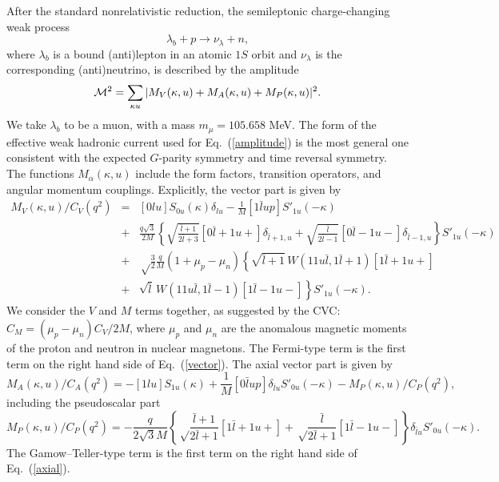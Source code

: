 After the standard nonrelativistic reduction, the semileptonic charge-changing 
weak process 
\begin{equation}\label{reaction}
  \lambda_b+p\to \nu_\lambda+n,
\end{equation}
where $\lambda_b$ is a bound (anti)lepton in an atomic $1S$ orbit and
$\nu_\lambda$ is the corresponding (anti)neutrino, is described by the
amplitude
\begin{equation}\label{amplitude}
  {\cal M}^2 = \sum_{\kappa u}| M_V(\kappa,u) + M_A(\kappa,u) 
  + M_P(\kappa,u) |^2.  
\end{equation} 
We take $\lambda_b$ to be a muon, with a mass $m_\mu = 105.658$ MeV. 
The form of the effective
weak hadronic current used for Eq.\ (\ref{amplitude}) is the most
general one consistent with the expected $G$-parity symmetry and time
reversal symmetry. The functions $M_\alpha(\kappa,u)$ include the form
factors,
transition operators, and angular momentum couplings. Explicitly, the
vector part is given by 
\begin{eqnarray}\label{vector}
  M_V(\kappa,u)/C_V(q^2)&=&[0lu]S_{0u}(\kappa)\delta_{lu}-\frac{1}{M}
  [1\bar lup]S'_{1u}(-\kappa)\nonumber\\
  &+&\frac{q\sqrt3}{2M}\left\lbrace \sqrt{\frac{\bar l+1}{2\bar l+3}}[0\bar l+1 u+]
    \delta_{\bar l+1,u}+\sqrt{\frac{\bar l}{2\bar l-1}}[0\bar l-1u-]\delta_{\bar l-1,u}
  \right\rbrace S'_{1u}(-\kappa)\nonumber\\
  &+&\sqrt\frac{3}{2}\frac{q}{M}(1+\mu_p-\mu_n)\left\lbrace \sqrt{\bar l+1}\,
    W(11u\bar l,1\bar l+1)[1\bar l+1u+]\right.\\
  &+&\left. \sqrt{\bar l}\,W(11u\bar l,1\bar l-1)[1\bar l-1u-]
  \right\rbrace S'_{1u}(-\kappa). \nonumber
\end{eqnarray}
We consider the $V$ and $M$ terms together, as
suggested by the CVC: $C_M = (\mu_p-\mu_n)C_V/2M$, where $\mu_p$ and $\mu_n$ are
the anomalous magnetic moments of the proton and neutron in nuclear magnetons.
The Fermi-type term is the first term on the right hand side of Eq.\
(\ref{vector}). The axial vector part is given by
\begin{equation}\label{axial}
  M_A(\kappa,u)/C_A(q^2)=-[1lu]S_{1u}(\kappa)+\frac{1}{M}[0\bar lup]
  \delta_{\bar lu}S'_{0u}(-\kappa)-M_P(\kappa,u)/C_P(q^2),
\end{equation}
including the pseudoscalar part
\begin{equation}\label{pseudo}
  M_P(\kappa,u)/C_P(q^2)=-\frac{q}{2\sqrt3 M}\left\lbrace 
    \sqrt\frac{\bar l+1}{2\bar l+1}[1\bar 
    l+1u+]+\sqrt\frac{\bar l}{2\bar l+1}[1\bar l-1u-]\right\rbrace 
  \delta_{\bar lu}S'_{0u}(-\kappa).
\end{equation}
The Gamow--Teller-type term is the first term on the right hand side of 
Eq.\ (\ref{axial}). 

